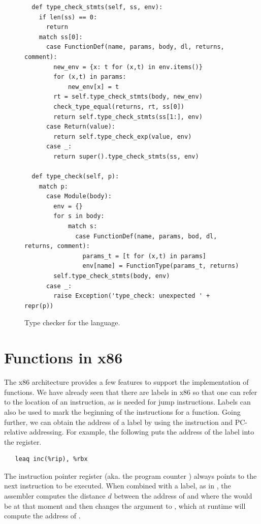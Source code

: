 \documentclass[7x10,nocrop]{TimesAPriori_MIT}%
\begin{document}
\begin{figure}[tp]
{\begin{lstlisting}
  def type_check_stmts(self, ss, env):
    if len(ss) == 0:
      return
    match ss[0]:
      case FunctionDef(name, params, body, dl, returns, comment):
        new_env = {x: t for (x,t) in env.items()}
        for (x,t) in params:
            new_env[x] = t
        rt = self.type_check_stmts(body, new_env)
        check_type_equal(returns, rt, ss[0])
        return self.type_check_stmts(ss[1:], env)
      case Return(value):
        return self.type_check_exp(value, env)
      case _:
        return super().type_check_stmts(ss, env)

  def type_check(self, p):
    match p:
      case Module(body):
        env = {}
        for s in body:
            match s:
              case FunctionDef(name, params, bod, dl, returns, comment):
                params_t = [t for (x,t) in params]
                env[name] = FunctionType(params_t, returns)
        self.type_check_stmts(body, env)
      case _:
        raise Exception('type_check: unexpected ' + repr(p))
\end{lstlisting}
\fi}
\caption{Type checker for the \LangFun{} language.}
\label{fig:type-check-Rfun}
\end{figure}


\clearpage

\section{Functions in x86}
\label{sec:fun-x86}



The x86 architecture provides a few features to support the
implementation of functions. We have already seen that there are
labels in x86 so that one can refer to the location of an instruction, as is
needed for jump instructions. Labels can also be used to mark the
beginning of the instructions for a function.  Going further, we can
obtain the address of a label by using the  instruction and
PC-relative addressing. For example, the following puts the
address of the  label into the  register.
\begin{lstlisting}
   leaq inc(%rip), %rbx
\end{lstlisting}
The instruction pointer register  (aka. the program counter
) always points to the next
instruction to be executed. When combined with a label, as in
, the assembler computes the distance $d$ between the
address of  and where the  would be at that moment
and then changes the  argument to ,
which at runtime will compute the address of .
\end{document}
